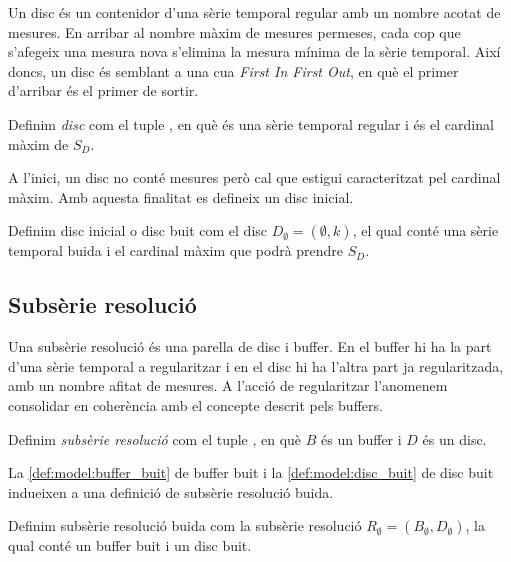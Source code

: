 Un disc és un contenidor d'una sèrie temporal regular amb un nombre
acotat de mesures. En arribar al nombre màxim de mesures permeses,
cada cop que s'afegeix una mesura nova s'elimina la mesura mínima de
la sèrie temporal.  Així doncs, un disc és semblant a una cua
\emph{First In First Out}, en què el primer d'arribar és el
primer de sortir.

\begin{definition}[Disc]
  Definim \emph{disc} com el tuple ,
  en què  és una sèrie temporal
  regular i  és el cardinal màxim
  de $S_D$.
\end{definition}

A l'inici, un disc no conté mesures però cal que estigui caracteritzat
pel cardinal màxim. Amb aquesta finalitat es defineix un disc inicial.

\begin{definition}\label{def:model:disc_buit}
  Definim disc inicial o disc buit com el disc $D_{\emptyset} =
  (\emptyset,k)$, el qual conté una sèrie temporal buida i el cardinal
  màxim que podrà prendre $S_D$.
\end{definition}




\subsection{Subsèrie resolució}\label{sec:model:subserie-resolucio}


Una subsèrie resolució és una parella de disc i buffer. En el
buffer hi ha la part d'una sèrie temporal a regularitzar i en el disc
hi ha l'altra part ja regularitzada, amb un nombre afitat de
mesures. A l'acció de regularitzar l'anomenem consolidar en coherència
amb el concepte descrit pels buffers. 



\begin{definition}
  Definim \emph{subsèrie resolució} com el tuple
  , en què $B$ és un buffer i $D$
  és un disc.
\end{definition}
 
La \autoref{def:model:buffer_buit} de buffer buit i la
\autoref{def:model:disc_buit} de disc buit indueixen a una definició
de subsèrie resolució buida.  

\begin{definition}\label{def:model:subserie_resolucio_buida}
  Definim subsèrie resolució buida com la subsèrie resolució $R_{\emptyset}
  = (B_{\emptyset},D_{\emptyset})$, la qual conté un buffer buit i un
  disc buit.
\end{definition}


